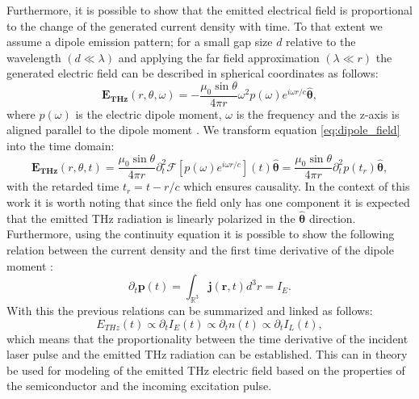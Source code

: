 Furthermore, it is possible to show that the emitted electrical field is proportional to 
the change of the generated current density with time. To that extent we assume a dipole emission pattern; for a small gap size $d$ relative to the wavelength $(d \ll \lambda)$ and applying the far field approximation $(\lambda \ll r)$ the generated electric field can be described in spherical coordinates as follows:
\begin{equation}
    \label{eq:dipole_field}
    \bm{E_{THz}}(r, \theta, \omega) = -\frac{\mu_0 \sin \theta}{4\pi r} \omega^2 p(\omega) e^{i\omega r/c} \hat{\bm{\theta}},
\end{equation}
where $p(\omega)$ is the electric dipole moment, $\omega$ is the frequency and the z-axis is aligned parallel to the dipole moment \cite{Jackson1998}. We transform equation \ref{eq:dipole_field} into the time domain:
\begin{equation}
    \label{eq:dipole_field}
    \bm{E_{THz}}(r, \theta, t) = \frac{\mu_0 \sin \theta}{4\pi r} \partial_t^2 \mathcal{F}[p(\omega) e^{i\omega r/c}](t) \hat{\bm{\theta}} =
    \frac{\mu_0 \sin \theta}{4\pi r} \partial_t^2 p(t_r) \hat{\bm{\theta}},
\end{equation}
with the retarded time $t_r = t - r/c$ which ensures causality. In the context of this work it is worth noting that since the field only has one component it is expected that the emitted THz radiation is linearly polarized in the $\hat{\bm{\theta}}$ direction. Furthermore, using the continuity equation it is possible to show the following relation between the current density and the first time derivative of the dipole moment \cite{Griffiths2017}:
\begin{equation}
    \partial_t \bm{p}(t) = \int_{\mathbb{R}^3} \bm{j}(\bm{r}, t) d^3r = I_E.
\end{equation}
With this the previous relations can be summarized and linked as follows:
\begin{equation}
    E_{THz}(t) \propto \partial_t I_E(t) \propto \partial_t n(t) \propto \partial_t I_L(t),
\end{equation}
which means that the proportionality between the time derivative of the incident
laser pulse and the emitted THz radiation can be established. This can in theory be used for modeling of the emitted THz electric field based on the properties of the semiconductor and the incoming excitation pulse.

